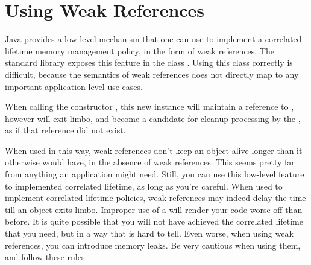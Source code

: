 \section{Using Weak References}

Java provides a low-level mechanism that one can use to implement a
correlated lifetime memory management policy, in the form of weak references.
The standard library exposes this feature in the class
. Using this class correctly is
difficult, because the semantics of weak references does not directly map to
any important application-level use cases.

\begin{definition}
When calling the constructor ,
 this new instance will maintain a reference to , however
  will exit limbo, and become a candidate for cleanup processing by 
the \jre, as if that reference did not exist.
\end{definition} 

When used in this way, weak references don't keep an object alive longer than it
otherwise would have, in the absence of weak references. 
This seems pretty far from anything an application might
need. Still, you can use this low-level feature to implemented correlated
lifetime, as long as you're careful. 
When used to implement correlated lifetime policies, weak references may
indeed delay the time till an object exits limbo.
Improper use of a  will
render your code worse off than before. It is quite possible that you will not
have achieved the correlated lifetime that you need, but in a way that is hard
to tell. Even worse, when using weak references, you can introduce memory
leaks. Be very cautious when using them, and follow these rules.

